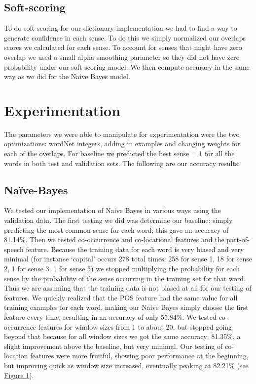 \documentclass{article}
\begin{document}
\subsection{Soft-scoring}
To do soft-scoring for our dictionary implementation we had to find a way to generate confidence in each sense. To do this we simply normalized our overlaps scores we calculated for each sense. To account for senses that might have zero overlap we used a small alpha smoothing parameter so they did not have zero probability under our soft-scoring model. We then compute accuracy in the same way as we did for the Naive Bayes model.

\section{Experimentation}

The parameters we were able to manipulate for experimentation were the two optimizations: wordNet integers, adding in examples and changing weights for each of the overlaps. For baseline we predicted the best sense = 1 for all the words in both test and validation sets. The following are our accuracy results: 

\subsection{Na\"{i}ve-Bayes}

We tested our implementation of Naive Bayes in various ways using the validation data. The first testing we did was determine our baseline: simply predicting the most common sense for each word; this gave an accuracy of 81.14\%. Then we tested co-occurrence and co-locational features and the part-of-speech feature. Because the training data for each word is very biased and very minimal (for instance `capital' occurs 278 total times: 258 for sense 1, 18 for sense 2, 1 for sense 3, 1 for sense 5) we stopped multiplying the probability for each sense by the probability of the sense occurring in the training set for that word. Thus we are assuming that the training data is not biased at all for our testing of features. We quickly realized that the POS feature had the same value for all training examples for each word, making our Naive Bayes simply choose the first feature every time, resulting in an accuracy of only 55.84\%. We tested co-occurrence features for window sizes from 1 to about 20, but stopped going beyond that because for all window sizes we got the same accuracy: 81.35\%, a slight improvement above the baseline, but very minimal. Our testing of co-location features were more fruitful, showing poor performance at the beginning, but improving quick as window size increased, eventually peaking at 82.21\% (see \hyperref[fig:col]{Figure 1}).
\end{document}
